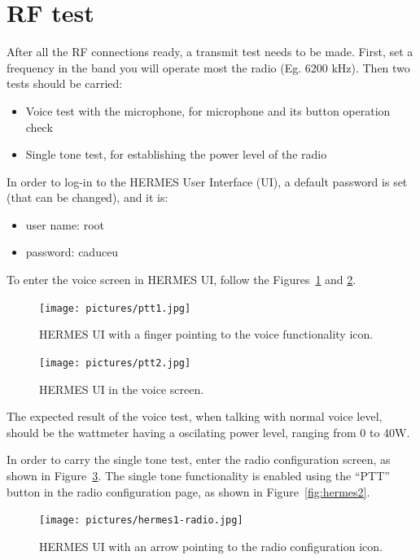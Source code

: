 \documentclass[11pt,a4paper]{article}
\begin{document}
\section{RF test}

After all the RF connections ready, a transmit test needs to be made. First, set a frequency
in the band you will operate most the radio (Eg. 6200 kHz). Then two tests should be carried:
\begin{itemize}
\item Voice test with the microphone, for microphone and its button operation check
\item Single tone test, for establishing the power level of the radio
\end{itemize}

In order to log-in to the HERMES User Interface (UI), a default password is set (that can be changed), and it is:
\begin{itemize}
\item user name: root
\item password: caduceu
\end{itemize}

To enter the voice screen in HERMES UI, follow the Figures~\ref{fig:ptt1} and \ref{fig:ptt2}.

\begin{figure}[H]
  \centering
  \texttt{[image: pictures/ptt1.jpg]}
  \caption{HERMES UI with a finger pointing to the voice functionality icon.}
  \label{fig:ptt1}
\end{figure}

\begin{figure}[H]
  \centering
  \texttt{[image: pictures/ptt2.jpg]}
  \caption{HERMES UI in the voice screen.}
  \label{fig:ptt2}
\end{figure}


The expected result of the voice test, when talking with normal voice level, should be the wattmeter having a oscilating power level,
ranging from 0 to 40W.

In order to carry the single tone test, enter the radio configuration screen, as shown in Figure~\ref{fig:hermes1}. The single tone functionality
is enabled using the ``PTT'' button in the radio configuration page, as shown in Figure~\ref{fig:hermes2}.

\begin{figure}[H]
  \centering
  \texttt{[image: pictures/hermes1-radio.jpg]}
  \caption{HERMES UI with an arrow pointing to the radio configuration icon.}
  \label{fig:hermes1}
\end{figure}
\end{document}
